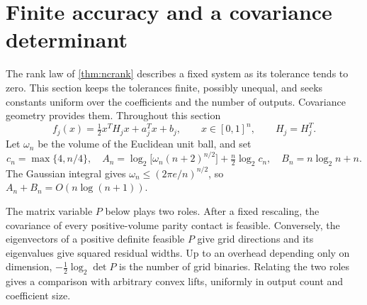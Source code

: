 \section{Finite accuracy and a covariance determinant}\label{sec:finite-quadratic}

The rank law of \cref{thm:ncrank} describes a fixed system as its
tolerance tends to zero. This section keeps the tolerances finite,
possibly unequal, and seeks constants uniform over the coefficients and
the number of outputs. Covariance geometry provides them. Throughout
this section
\[
 f_j(x)=\tfrac12x^TH_jx+a_j^Tx+b_j,\qquad x\in[0,1]^n,
 \qquad H_j=H_j^T.
\]
Let $\omega_n$ be the volume of the Euclidean unit ball, and set
\begin{equation}\label{eq:finite-constants}
 c_n=\max\{4,n/4\},\quad
 A_n=\log_2\!\bigl[\omega_n(n+2)^{n/2}\bigr]
                   +\tfrac n2\log_2c_n,\quad
 B_n=n\log_2 n+n.
\end{equation}
The Gaussian integral gives
$\omega_n\le(2\pi e/n)^{n/2}$, so $A_n+B_n=O(n\log(n+1))$.

The matrix variable $P$ below plays two roles. After a fixed rescaling,
the covariance of every positive-volume parity contact is feasible.
Conversely, the eigenvectors of a positive definite feasible $P$ give
grid directions and its eigenvalues give squared residual widths.
Up to an overhead depending only on dimension, $-\tfrac12\log_2\det P$
is the number of grid binaries. Relating the two roles gives a
comparison with arbitrary convex lifts, uniformly in output count and
coefficient size.

